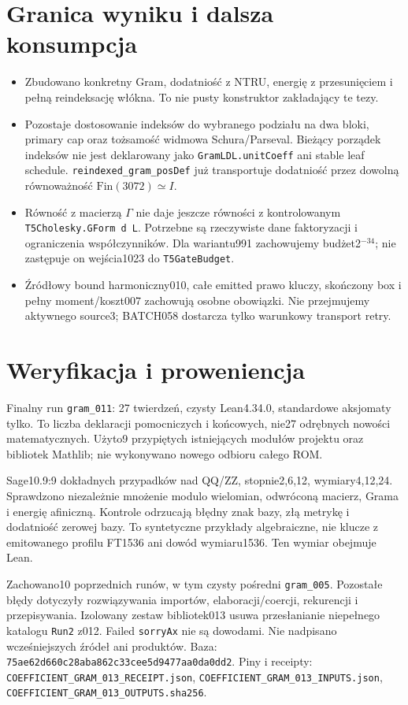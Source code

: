 \documentclass[11pt,a4paper]{article}
\newcommand{\code}[1]{\nolinkurl{#1}}
\begin{document}
\section{Granica wyniku i dalsza konsumpcja}
\begin{itemize}
\item Zbudowano konkretny Gram, dodatniość z NTRU, energię z przesunięciem
i pełną reindeksację włókna. To nie pusty konstruktor zakładający te tezy.
\item Pozostaje dostosowanie indeksów do wybranego podziału na dwa bloki,
primary cap oraz tożsamość widmowa Schura/Parseval. Bieżący porządek indeksów
nie jest deklarowany jako \code{GramLDL.unitCoeff} ani stable leaf schedule.
\code{reindexed_gram_posDef} już transportuje dodatniość przez dowolną
równoważność $\mathrm{Fin}(3072)\simeq I$.
\item Równość z macierzą $\Gamma$ nie daje jeszcze równości z kontrolowanym
\code{T5Cholesky.GForm d L}. Potrzebne są rzeczywiste dane faktoryzacji
i ograniczenia współczynników. Dla wariantu991 zachowujemy budżet2$^{-34}$;
nie zastępuje on wejścia1023 do \code{T5GateBudget}.
\item Źródłowy bound harmoniczny010, całe emitted prawo kluczy, skończony
box i pełny moment/koszt007 zachowują osobne obowiązki. Nie przejmujemy
aktywnego source3; BATCH058 dostarcza tylko warunkowy transport retry.
\end{itemize}

\section{Weryfikacja i proweniencja}
Finalny run \code{gram_011}: 27 twierdzeń, czysty Lean4.34.0, standardowe
aksjomaty tylko. To liczba deklaracji pomocniczych i końcowych, nie27
odrębnych nowości matematycznych. Użyto9 przypiętych istniejących modułów
projektu oraz bibliotek Mathlib; nie wykonywano nowego odbioru całego ROM.

Sage10.9:9 dokładnych przypadków nad QQ/ZZ, stopnie2,6,12, wymiary4,12,24.
Sprawdzono niezależnie mnożenie modulo wielomian, odwróconą macierz,
Grama i energię afiniczną. Kontrole odrzucają błędny znak bazy, złą metrykę
i dodatniość zerowej bazy. To syntetyczne przykłady algebraiczne, nie klucze
z emitowanego profilu FT1536 ani dowód wymiaru1536. Ten wymiar obejmuje Lean.

Zachowano10 poprzednich runów, w tym czysty pośredni \code{gram_005}.
Pozostałe błędy dotyczyły rozwiązywania importów, elaboracji/coercji,
rekurencji i przepisywania. Izolowany zestaw bibliotek013 usuwa przesłanianie
niepełnego katalogu \code{Run2} z012. Failed \code{sorryAx} nie są dowodami.
Nie nadpisano wcześniejszych źródeł ani produktów. Baza:
\code{75ae62d660c28aba862c33cee5d9477aa0da0dd2}.
Piny i receipty: \code{COEFFICIENT_GRAM_013_RECEIPT.json},
\code{COEFFICIENT_GRAM_013_INPUTS.json}, \code{COEFFICIENT_GRAM_013_OUTPUTS.sha256}.
\end{document}
